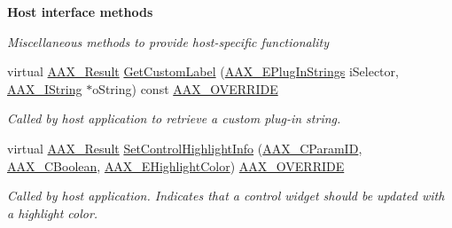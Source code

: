 \begin{Indent}{\bf Host interface methods}\par
{\em Miscellaneous methods to provide host-\/specific functionality }\begin{DoxyCompactItemize}
\item 
virtual \hyperlink{a00149_a4d8f69a697df7f70c3a8e9b8ee130d2f}{A\+A\+X\+\_\+\+Result} \hyperlink{a00017_a703c4508effd8b9e61e080296eeba113}{Get\+Custom\+Label} (\hyperlink{a00206_a86f7310877399d9d4d2ea4863d472476}{A\+A\+X\+\_\+\+E\+Plug\+In\+Strings} i\+Selector, \hyperlink{a00113}{A\+A\+X\+\_\+\+I\+String} $\ast$o\+String) const \hyperlink{a00149_ac2f24a5172689ae684344abdcce55463}{A\+A\+X\+\_\+\+O\+V\+E\+R\+R\+I\+D\+E}
\begin{DoxyCompactList}\small\item\em Called by host application to retrieve a custom plug-\/in string. \end{DoxyCompactList}\item 
virtual \hyperlink{a00149_a4d8f69a697df7f70c3a8e9b8ee130d2f}{A\+A\+X\+\_\+\+Result} \hyperlink{a00017_a951ac9d3546e1d31830778aa130b142e}{Set\+Control\+Highlight\+Info} (\hyperlink{a00149_a1440c756fe5cb158b78193b2fc1780d1}{A\+A\+X\+\_\+\+C\+Param\+I\+D}, \hyperlink{a00149_aa216506530f1d19a2965931ced2b274b}{A\+A\+X\+\_\+\+C\+Boolean}, \hyperlink{a00206_a143056a07989a48e5db3a101f1b12567}{A\+A\+X\+\_\+\+E\+Highlight\+Color}) \hyperlink{a00149_ac2f24a5172689ae684344abdcce55463}{A\+A\+X\+\_\+\+O\+V\+E\+R\+R\+I\+D\+E}
\begin{DoxyCompactList}\small\item\em Called by host application. Indicates that a control widget should be updated with a highlight color. \end{DoxyCompactList}\end{DoxyCompactItemize}
\end{Indent}
